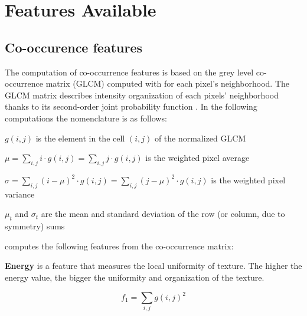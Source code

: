 \documentclass{InsightArticle}
\begin{document}
\section{Features Available}
\label{sec:features}

\subsection{Co-occurence features}
\label{sec:coocFeat}

The computation of co-occurrence features is based on the grey level co-occurrence matrix (GLCM) computed with  for each pixel's neighborhood. The GLCM matrix describes intensity organization of each pixels' neighborhood thanks to its second-order joint probability function \cite{coocFeat1,coocFeat2,coocFeat3,coocFeat4}. In the following computations the nomenclature is as follows:

\begin{math} g(i,j) \end{math} is the element in the cell \begin{math}(i,j)\end{math} of the normalized GLCM

\begin{math} \mu = \sum_{i,j}\nolimits i \cdot g(i, j) = \sum_{i,j}\nolimits j \cdot g(i, j) \end{math} is the weighted pixel average

\begin{math} \sigma = \sum_{i,j}\nolimits (i - \mu)^2 \cdot g(i, j) = \sum_{i,j}\nolimits (j- \mu)^2 \cdot g(i, j) \end{math} is the weighted pixel variance

\begin{math} \mu_t \end{math} and \begin{math} \sigma_t \end{math} are the mean and standard deviation of the row (or column, due to symmetry) sums

 computes the following features from the co-occurrence matrix:

\textbf{Energy} is a feature that measures the local uniformity of texture. The higher the energy value, the bigger the uniformity and organization of the texture. 

\begin{equation} \label{eqn:ShapeInfluenceTerm}
f_1 = \sum_{i,j}\nolimits g(i, j)^2
\end{equation}
\end{document}

